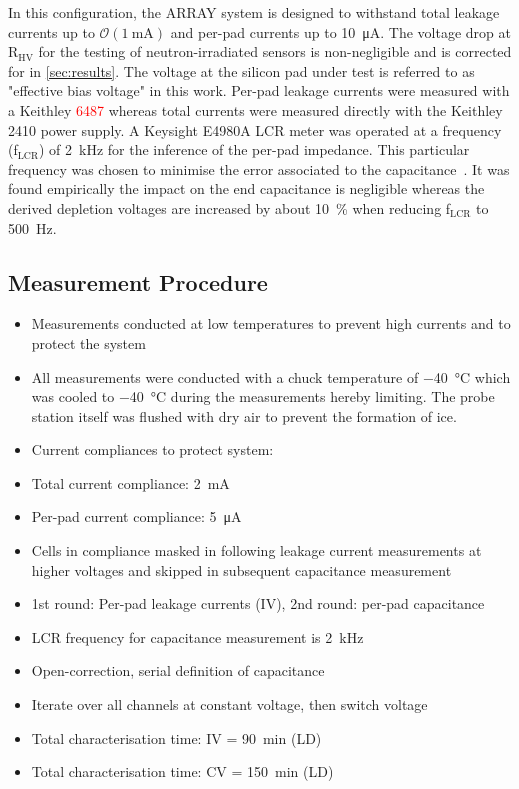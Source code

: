 In this configuration, the ARRAY system is designed to withstand total leakage currents up to $\mathcal{O}(\SI{1}{\milli\ampere})$ and per-pad currents up to \SI{10}{\micro\ampere}.
The voltage drop at R$_\text{HV}$ for the testing of neutron-irradiated sensors is non-negligible and is corrected for in \ref{sec:results}.
The voltage at the silicon pad under test is referred to as "effective bias voltage" in this work.
Per-pad leakage currents were measured with a Keithley \textcolor{red}{6487} whereas total currents were measured directly with the Keithley 2410 power supply.
A Keysight E4980A LCR meter was operated at a frequency (f$_\text{LCR}$) of \SI{2}{\kilo\hertz} for the inference of the per-pad impedance.
This particular frequency was chosen to minimise the error associated to the capacitance~\cite{pitters:array2019}.
It was found empirically the impact on the end capacitance is negligible whereas the derived depletion voltages are increased by about \SI{10}{\percent} when reducing f$_\text{LCR}$ to \SI{500}{\hertz}. 


\subsection{Measurement Procedure}
\label{subsec:setup_procedure}
\begin{itemize}
	\item Measurements conducted at low temperatures to prevent high currents and to protect the system
	\item All measurements were conducted with a chuck temperature of \SI{-40}{\celsius} which was cooled to \SI{-40}{\celsius} during the measurements hereby limiting.
	The probe station itself was flushed with dry air to prevent the formation of ice.
	\item Current compliances to protect system:
	\item Total current compliance: \SI{2}{\milli\ampere}
	\item Per-pad current compliance: \SI{5}{\micro\ampere}
	\item Cells in compliance masked in following leakage current measurements at higher voltages and skipped in subsequent capacitance measurement
	\item 1st round: Per-pad leakage currents (IV), 2nd round: per-pad capacitance
	\item LCR frequency for capacitance measurement is \SI{2}{\kilo\hertz}
	\item Open-correction, serial definition of capacitance
	\item Iterate over all channels at constant voltage, then switch voltage
	\item Total characterisation time: IV = \SI{90}{\minute} (LD)
	\item Total characterisation time: CV = \SI{150}{\minute} (LD)

\end{itemize}